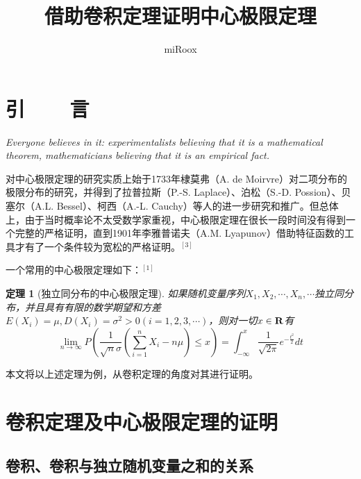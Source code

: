 \documentclass[a4paper]{ctexart}
\newtheorem{thm}{定理}
\begin{document}
\title{借助卷积定理证明中心极限定理}

\author{miRoox}



\section{引~~~~言}
    \emph{Everyone believes in it: experimentalists believing that it is a mathematical theorem, mathematicians believing that it is an empirical fact.} \\


    对中心极限定理的研究实质上始于1733年棣莫弗（A. de Moirvre）对二项分布的极限分布的研究，并得到了拉普拉斯（P.-S. Laplace）、泊松（S.-D. Possion）、贝塞尔（A.L. Bessel）、柯西（A.-L. Cauchy）等人的进一步研究和推广。但总体上，由于当时概率论不太受数学家重视，中心极限定理在很长一段时间没有得到一个完整的严格证明，直到1901年李雅普诺夫（A.M. Lyapunov）借助特征函数的工具才有了一个条件较为宽松的严格证明。$^{[3]}$


    一个常用的中心极限定理如下：$^{[1]}$
    \begin{thm}[独立同分布的中心极限定理]\label{thm:CLToInID}
        如果随机变量序列$ X_{1},X_{2},\cdots ,X_{n},\cdots $独立同分布，并且具有有限的数学期望和方差$ E(X_{i})=\mu ,D(X_{i})=\sigma ^{2}>0 (i=1,2,3,\cdots ) $，则对一切$x\in {\rm\bf{R}}$有
        \begin{equation}\label{eq:CLToInID}
          \lim_{n\to\infty} P(\frac{1}{\sqrt{n}\sigma}(\sum_{i=1}^{n}X_{i}-n\mu )\le x) = \int_{-\infty }^{x}\frac{1}{\sqrt{2\pi}}e^{-\frac{t^{2}}{2}}dt
        \end{equation}
    \end{thm}


    本文将以上述定理为例，从卷积定理的角度对其进行证明。

\section{卷积定理及中心极限定理的证明}

\subsection{卷积、卷积与独立随机变量之和的关系}
\end{document}
